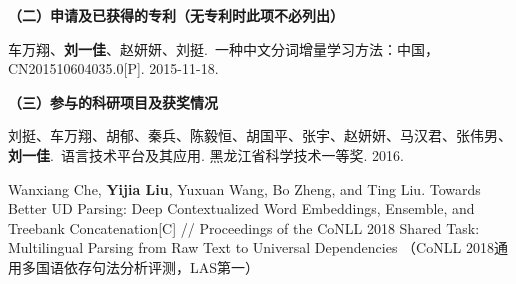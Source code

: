 \begin{publication}
\noindent\textbf{（二）申请及已获得的专利（无专利时此项不必列出）}
\begin{publist}
\item 车万翔、\textbf{刘一佳}、赵妍妍、刘挺.~一种中文分词增量学习方法：中国，CN201510604035.0[P]. 2015-11-18.
\end{publist}

\noindent\textbf{（三）参与的科研项目及获奖情况}
\begin{publist}
\item 刘挺、车万翔、胡郁、秦兵、陈毅恒、胡国平、张宇、赵妍妍、马汉君、张伟男、\textbf{刘一佳}.~语言技术平台及其应用. 黑龙江省科学技术一等奖. 2016.
\item Wanxiang Che, \textbf{Yijia Liu}, Yuxuan Wang, Bo Zheng, and Ting Liu. Towards Better UD Parsing: Deep Contextualized Word Embeddings, Ensemble, and Treebank Concatenation[C] // Proceedings of the CoNLL 2018 Shared Task: Multilingual Parsing from Raw Text to Universal Dependencies （CoNLL 2018通用多国语依存句法分析评测，LAS第一）
\end{publist}
\end{publication}
